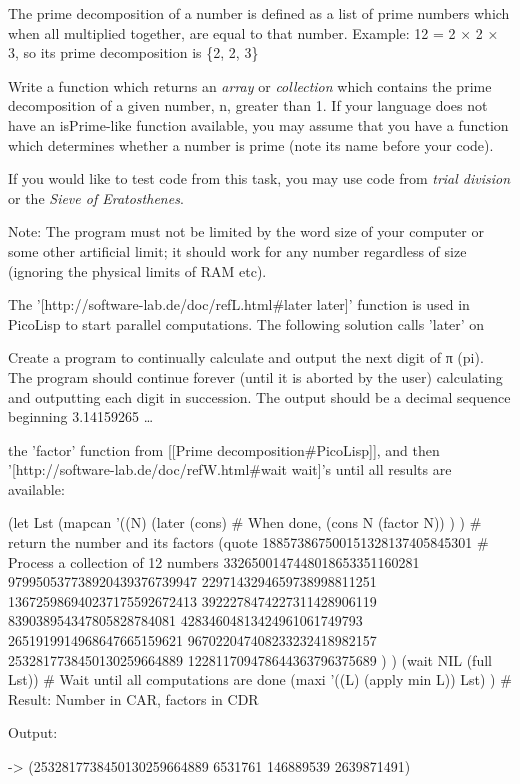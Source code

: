 The prime decomposition of a number is defined as a list of prime
numbers which when all multiplied together, are equal to that number.
Example: 12 = 2 × 2 × 3, so its prime decomposition is \{2, 2, 3\}

Write a function which returns an \emph{array} or
\emph{collection} which contains the prime
decomposition of a given number, n, greater than 1. If your language
does not have an isPrime-like function available, you may assume that
you have a function which determines whether a number is prime (note its
name before your code).

If you would like to test code from this task, you may use code from
\emph{trial division} or the
\emph{Sieve of Eratosthenes}.

Note: The program must not be limited by the word size of your computer
or some other artificial limit; it should work for any number regardless
of size (ignoring the physical limits of RAM etc).


\begin{wideverbatim}

The '[http://software-lab.de/doc/refL.html#later later]' function is used in
PicoLisp to start parallel computations. The following solution calls 'later' on


Create a program to continually calculate and output the next digit of π
(pi). The program should continue forever (until it is aborted by the
user) calculating and outputting each digit in succession. The output
should be a decimal sequence beginning 3.14159265 \ldots{}


the 'factor' function from [[Prime decomposition#PicoLisp]], and then
'[http://software-lab.de/doc/refW.html#wait wait]'s until all results are
available:

(let Lst
   (mapcan
      '((N)
         (later (cons)               # When done,
            (cons N (factor N)) ) )  # return the number and its factors
      (quote
         188573867500151328137405845301  # Process a collection of 12 numbers
         3326500147448018653351160281
         979950537738920439376739947
         2297143294659738998811251
         136725986940237175592672413
         3922278474227311428906119
         839038954347805828784081
         42834604813424961061749793
         2651919914968647665159621
         967022047408233232418982157
         2532817738450130259664889
         122811709478644363796375689 ) )
   (wait NIL (full Lst))  # Wait until all computations are done
   (maxi '((L) (apply min L)) Lst) )  # Result: Number in CAR, factors in CDR

Output:

-> (2532817738450130259664889 6531761 146889539 2639871491)

\end{wideverbatim}

